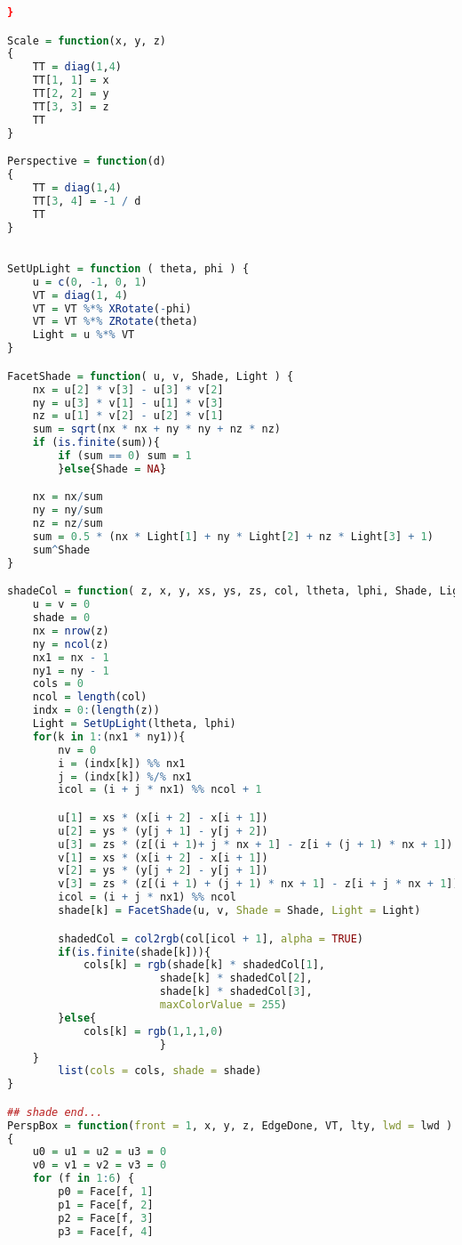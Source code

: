 \begin{lstlisting}[language = R]
}

Scale = function(x, y, z)
{
    TT = diag(1,4)    
    TT[1, 1] = x
    TT[2, 2] = y
    TT[3, 3] = z
    TT
}

Perspective = function(d)
{
    TT = diag(1,4)
    TT[3, 4] = -1 / d
    TT
}

        
SetUpLight = function ( theta, phi ) {
    u = c(0, -1, 0, 1)
    VT = diag(1, 4)
    VT = VT %*% XRotate(-phi)
    VT = VT %*% ZRotate(theta)
    Light = u %*% VT
}

FacetShade = function( u, v, Shade, Light ) {
    nx = u[2] * v[3] - u[3] * v[2]
    ny = u[3] * v[1] - u[1] * v[3]
    nz = u[1] * v[2] - u[2] * v[1]
    sum = sqrt(nx * nx + ny * ny + nz * nz)
    if (is.finite(sum)){
        if (sum == 0) sum = 1
        }else{Shade = NA}

    nx = nx/sum
    ny = ny/sum
    nz = nz/sum
    sum = 0.5 * (nx * Light[1] + ny * Light[2] + nz * Light[3] + 1)
    sum^Shade   
}

shadeCol = function( z, x, y, xs, ys, zs, col, ltheta, lphi, Shade, Light) {
    u = v = 0
    shade = 0
    nx = nrow(z)
    ny = ncol(z)
    nx1 = nx - 1
    ny1 = ny - 1
    cols = 0
    ncol = length(col)
    indx = 0:(length(z))
    Light = SetUpLight(ltheta, lphi)
    for(k in 1:(nx1 * ny1)){
        nv = 0
        i = (indx[k]) %% nx1 
        j = (indx[k]) %/% nx1
        icol = (i + j * nx1) %% ncol + 1

        u[1] = xs * (x[i + 2] - x[i + 1])
        u[2] = ys * (y[j + 1] - y[j + 2])
        u[3] = zs * (z[(i + 1)+ j * nx + 1] - z[i + (j + 1) * nx + 1])
        v[1] = xs * (x[i + 2] - x[i + 1])
        v[2] = ys * (y[j + 2] - y[j + 1])
        v[3] = zs * (z[(i + 1) + (j + 1) * nx + 1] - z[i + j * nx + 1])
        icol = (i + j * nx1) %% ncol
        shade[k] = FacetShade(u, v, Shade = Shade, Light = Light)

        shadedCol = col2rgb(col[icol + 1], alpha = TRUE)
        if(is.finite(shade[k])){
            cols[k] = rgb(shade[k] * shadedCol[1], 
                        shade[k] * shadedCol[2], 
                        shade[k] * shadedCol[3], 
                        maxColorValue = 255)
        }else{
            cols[k] = rgb(1,1,1,0)
                        }
    }
        list(cols = cols, shade = shade)
}

## shade end...
PerspBox = function(front = 1, x, y, z, EdgeDone, VT, lty, lwd = lwd )
{
    u0 = u1 = u2 = u3 = 0
    v0 = v1 = v2 = v3 = 0
    for (f in 1:6) {
        p0 = Face[f, 1]
        p1 = Face[f, 2]
        p2 = Face[f, 3]
        p3 = Face[f, 4]


\end{lstlisting}
